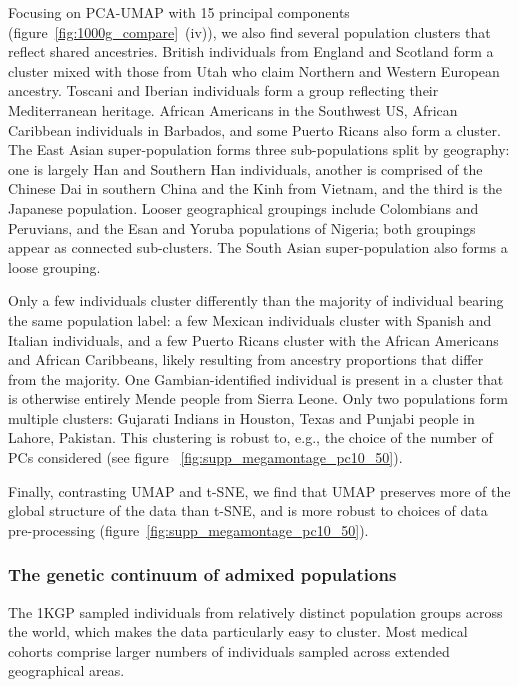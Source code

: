 \documentclass[12pt]{pnas-new}
\begin{document}
Focusing on PCA-UMAP with 15 principal components (figure~\ref{fig:1000g_compare}~(iv)), we also find several population clusters that reflect shared ancestries. British individuals from England and Scotland form a cluster mixed with those from Utah who claim Northern and Western European ancestry. Toscani and Iberian individuals form a group reflecting their Mediterranean heritage. African Americans in the Southwest US, African Caribbean individuals in Barbados, and some Puerto Ricans also form a cluster. The East Asian super-population forms three sub-populations split by geography: one is largely Han and Southern Han individuals, another is comprised of the Chinese Dai in southern China and the Kinh from Vietnam, and the third is the Japanese population. Looser geographical groupings include Colombians and Peruvians, and the Esan and Yoruba populations of Nigeria; both groupings appear as connected sub-clusters. The South Asian super-population also forms a loose grouping. 

Only a few individuals cluster differently than the majority of individual bearing the same population label: a few Mexican individuals cluster with Spanish and Italian individuals, and a few Puerto Ricans cluster with the African Americans and African Caribbeans, likely resulting from ancestry proportions that differ from the majority. One Gambian-identified individual is present in a cluster that is otherwise entirely Mende people from Sierra Leone. Only two populations form multiple clusters: Gujarati Indians in Houston, Texas and Punjabi people in Lahore, Pakistan. This clustering is robust to, e.g., the choice of the number of PCs considered (see figure ~\ref{fig:supp_megamontage_pc10_50}).

Finally, contrasting UMAP and t-SNE, we find that UMAP preserves more of the global structure of the data than t-SNE, and is more robust to choices of data pre-processing (figure~\ref{fig:supp_megamontage_pc10_50}).

\subsubsection*{The genetic continuum of admixed populations} The 1KGP sampled individuals from relatively distinct population groups across the world, which makes the data particularly easy to cluster. Most medical cohorts comprise larger numbers of individuals sampled across extended geographical areas. 
\end{document}

